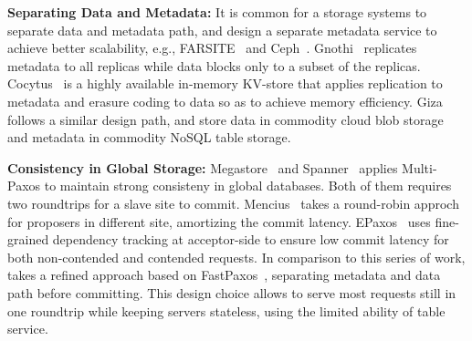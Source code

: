 
{\bf Separating Data and Metadata:}
It is common for a storage systems to separate data and metadata path, and
design a separate metadata service to achieve better scalability, e.g.,
FARSITE~\cite{adya02farsite} and Ceph~\cite{weil06ceph}.
Gnothi~\cite{wang12gnothi} replicates metadata to all replicas while data blocks
only to a subset of the replicas. Cocytus~\cite{zhang16efficient} is a highly
available in-memory KV-store that applies replication to metadata and erasure
coding to data so as to achieve memory efficiency. Giza follows a similar design
path, and store data in commodity cloud blob storage and metadata in commodity
NoSQL table storage.

{\bf Consistency in Global Storage:}
Megastore~\cite{baker11megastore} and Spanner~\cite{spanner:osdi12} applies
Multi-Paxos to maintain strong consisteny in global databases. Both of them
requires two roundtrips for a slave site to commit. Mencius~\cite{mao08mencius}
takes a round-robin approch for proposers in different site, amortizing the
commit latency. EPaxos~\cite{epaxos:sosp13} uses fine-grained dependency
tracking at acceptor-side to ensure low commit latency for both non-contended
and contended requests. In comparison to this series of work, \name takes a
refined approach based on FastPaxos~\cite{lamport05fast}, separating metadata
and data path before committing. This design choice allows \name to serve most
requests still in one roundtrip while keeping servers stateless, using the
limited ability of table service. 


